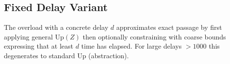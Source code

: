 \subsection{Fixed Delay Variant}
The overload with a concrete delay \(d\) approximates exact passage by first applying general \(\mathrm{Up}(Z)\) then optionally constraining with coarse bounds expressing that at least \(d\) time has elapsed. For large delays \(> 1000\) this degenerates to standard \(\mathrm{Up}\) (abstraction).
